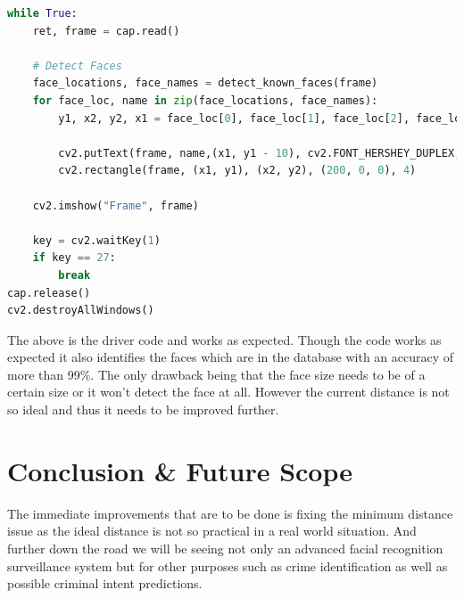 \documentclass[14.49pt, a4paper, one side, margin = 2in]{article}
\begin{document}
\begin{lstlisting}[breaklines, language=Python]
while True:
    ret, frame = cap.read()

    # Detect Faces
    face_locations, face_names = detect_known_faces(frame)
    for face_loc, name in zip(face_locations, face_names):
        y1, x2, y2, x1 = face_loc[0], face_loc[1], face_loc[2], face_loc[3]

        cv2.putText(frame, name,(x1, y1 - 10), cv2.FONT_HERSHEY_DUPLEX, 1, (0, 0, 200), 2)
        cv2.rectangle(frame, (x1, y1), (x2, y2), (200, 0, 0), 4)

    cv2.imshow("Frame", frame)

    key = cv2.waitKey(1)
    if key == 27:
        break
cap.release()
cv2.destroyAllWindows()
\end{lstlisting}
 
\par The above is the driver code and works as expected.
Though the code works as expected it also identifies the faces which are in the database with an accuracy of more than 99\%. The only drawback being that the face size needs to be of a certain size or it won't detect the face at all. However the current distance is not so ideal and thus it needs to be improved further.
\clearpage
\section{Conclusion \& Future Scope}
The immediate improvements that are to be done is fixing the minimum distance issue as the ideal distance is not so practical in a real world situation. And further down the road we will be seeing not only an advanced facial recognition surveillance system but for other purposes such as crime identification as well as possible criminal intent predictions.
\clearpage


\end{document}
